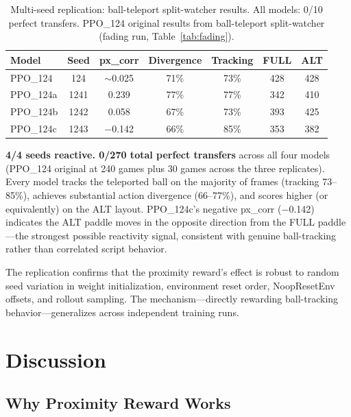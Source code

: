 \documentclass[11pt]{article}
\begin{document}
\begin{table}[h]
\centering
\begin{tabular}{lcccccc}
\toprule
\textbf{Model} & \textbf{Seed} & \textbf{px\_corr} & \textbf{Divergence} &
\textbf{Tracking} & \textbf{FULL} & \textbf{ALT} \\
\midrule
PPO\_124  & 124  & $\sim$0.025 & 71\% & 73\% & 428 & 428 \\
PPO\_124a & 1241 & 0.239       & 77\% & 77\% & 342 & 410 \\
PPO\_124b & 1242 & 0.058       & 67\% & 73\% & 393 & 425 \\
PPO\_124c & 1243 & $-$0.142   & 66\% & 85\% & 353 & 382 \\
\bottomrule
\end{tabular}
\caption{Multi-seed replication: ball-teleport split-watcher results.
All models: 0/10 perfect transfers. PPO\_124 original results from
ball-teleport split-watcher (fading run, Table~\ref{tab:fading}).}
\label{tab:replication}
\end{table}

\textbf{4/4 seeds reactive. 0/270 total perfect transfers} across all four
models (PPO\_124 original at 240 games plus 30 games across the three
replicates). Every model tracks the teleported ball on the majority of frames
(tracking 73--85\%), achieves substantial action divergence (66--77\%), and
scores higher (or equivalently) on the ALT layout. PPO\_124c's negative
px\_corr ($-$0.142) indicates the ALT paddle moves in the opposite direction
from the FULL paddle---the strongest possible reactivity signal, consistent
with genuine ball-tracking rather than correlated script behavior.

The replication confirms that the proximity reward's effect is robust to
random seed variation in weight initialization, environment reset order,
NoopResetEnv offsets, and rollout sampling. The mechanism---directly rewarding
ball-tracking behavior---generalizes across independent training runs.

\section{Discussion}

\subsection{Why Proximity Reward Works}
\end{document}
